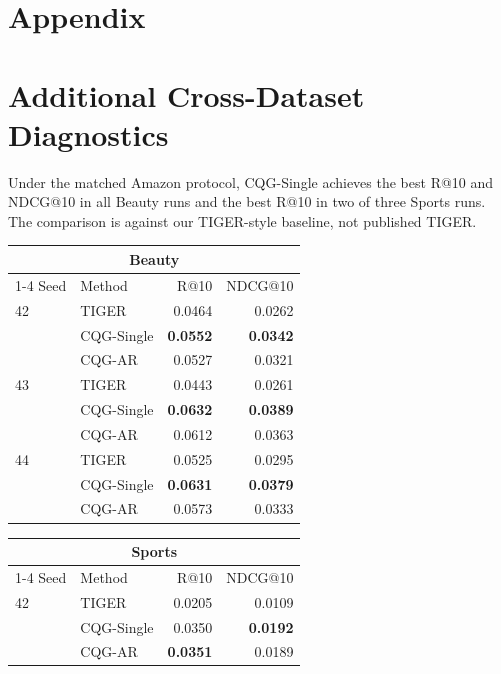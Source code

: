 \documentclass[letterpaper]{article}
\begin{document}
\pagestyle{plain}
\onecolumn
\appendix
\setcounter{secnumdepth}{2}

\section*{Appendix}

\section{Additional Cross-Dataset Diagnostics}
\label{app:auto-completed}
Under the matched Amazon protocol, CQG-Single achieves the best R@10 and
NDCG@10 in all Beauty runs and the best R@10 in two of three Sports runs.
The comparison is against our TIGER-style baseline, not published TIGER.
\begin{table}[H]
\centering
\small
\begin{minipage}[t]{0.48\textwidth}
\centering
\begin{tabular}{llrr}
\toprule
\multicolumn{4}{c}{\textbf{Beauty}} \\
\cmidrule(lr){1-4}
Seed & Method & R@10 & NDCG@10 \\
\midrule
42 & TIGER & 0.0464 & 0.0262 \\
 & CQG-Single & \textbf{0.0552} & \textbf{0.0342} \\
 & CQG-AR & 0.0527 & 0.0321 \\
43 & TIGER & 0.0443 & 0.0261 \\
 & CQG-Single & \textbf{0.0632} & \textbf{0.0389} \\
 & CQG-AR & 0.0612 & 0.0363 \\
44 & TIGER & 0.0525 & 0.0295 \\
 & CQG-Single & \textbf{0.0631} & \textbf{0.0379} \\
 & CQG-AR & 0.0573 & 0.0333 \\
\bottomrule
\end{tabular}
\end{minipage}\hfill
\begin{minipage}[t]{0.48\textwidth}
\centering
\begin{tabular}{llrr}
\toprule
\multicolumn{4}{c}{\textbf{Sports}} \\
\cmidrule(lr){1-4}
Seed & Method & R@10 & NDCG@10 \\
\midrule
42 & TIGER & 0.0205 & 0.0109 \\
 & CQG-Single & 0.0350 & \textbf{0.0192} \\
 & CQG-AR & \textbf{0.0351} & 0.0189 \\

\end{tabular}
\end{minipage}
\end{table}
\end{document}
